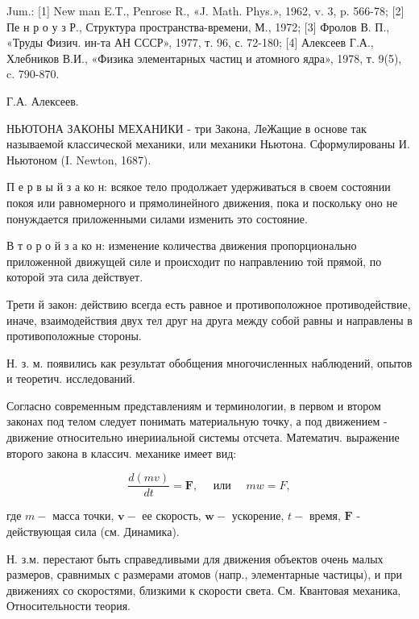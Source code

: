 \documentclass[10pt]{article}
\begin{document}
Jum.: [1] New man E.T., Penrose R., «J. Math. Phys.», 1962, v. 3, p. 566-78; [2] Пе н р о у з Р., Структура пространства-времени, М., 1972; [3] Фролов В. П., «Труды Физич. ин-та АН СССР», 1977, т. 96, с. 72-180; [4] Алексеев Г.А., Хлебников В.И., «Физика элементарных частиц и атомного ядра», 1978, т. 9(5), c. 790-870.

Г.А. Алексеев.



НЬЮТОНА ЗАКОНЫ МЕХАНИКИ - три Закона, ЛеЖащие в основе так называемой классической механики, или механики Ньютона. Сформулированы И. Ньютоном (I. Newton, 1687).



П е р в ы й з а ко н: всякое тело продолжает удерживаться в своем состоянии покоя или равномерного и прямолинейного движения, пока и поскольку оно не понуждается приложенными силами изменить это состояние.



В т о р о й з а ко н: изменение количества движения пропорционально приложенной движущей силе и происходит по направлению той прямой, по которой эта сила действует.



Трети й закон: действию всегда есть равное и противоположное противодействие, иначе, взаимодействия двух тел друг на друга между собой равны и направлены в противоположные стороны.



Н. з. м. появились как результат обобщения многочисленных наблюдений, опытов и теоретич. исследований.



Согласно современным представлениям и терминологии, в первом и втором законах под телом следует понимать материальную точку, а под движением - движение относительно инерииальной системы отсчета. Математич. выражение второго закона в классич. механике имеет вид:



\[

\frac{d(m v)}{d t}=\boldsymbol{F}, \quad \text { или } \quad m w=F,

\]



где $m-$ масса точки, $\boldsymbol{v}-$ ее скорость, $\boldsymbol{w}-$ ускорение, $t-$ время, $\boldsymbol{F}$ - действующая сила (см. Динамика).



Н. з.м. перестают быть справедливыми для движения объектов очень малых размеров, сравнимых с размерами атомов (напр., элементарные частицы), и при движениях со скоростями, близкими к скорости света. См. Квантовая механика, Относительности теория.
\end{document}
